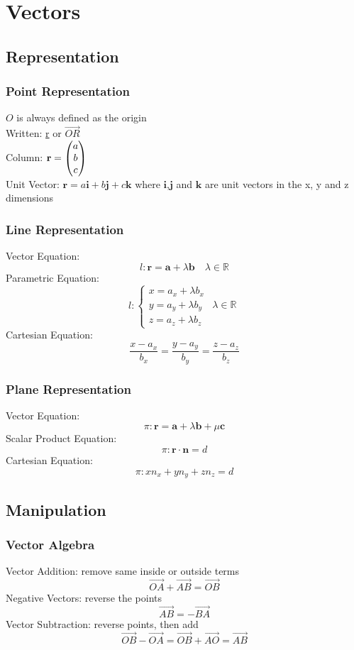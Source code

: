 \documentclass[../main]{subfiles}
\newcommand*\colvec[3][]{
    \begin{pmatrix}\ifx\relax#1\relax\else#1\\\fi#2\\#3\end{pmatrix}
}
\begin{document}
\section{Vectors}

\subsection{Representation}

	\subsubsection{Point Representation}
	\(O\) is always defined as the origin \\
	Written: \underline{r} or \( \overrightarrow{OR} \) \\
	Column: \( \mathbf{r} = \colvec[a]{b}{c} \) \\
	Unit Vector: \( \mathbf{r} = a\mathbf{i} + b\mathbf{j} + c\mathbf{k} \) where \(\mathbf{i}\),\(\mathbf{j}\) and \(\mathbf{k}\) are unit vectors in the x, y and z dimensions
	\subsubsection{Line Representation}
	Vector Equation:
	\[ l: \mathbf{r} = \mathbf{a} + \lambda \mathbf{b} \quad \lambda \in \mathbb{R} \]
	Parametric Equation:
	\begin{equation*}
		l:\begin{cases}
			x = a_x + \lambda b_x \\
			y = a_y + \lambda b_y \quad \lambda \in \mathbb{R} \\
			z = a_z + \lambda b_z 
		\end{cases}
	\end{equation*}
	Cartesian Equation:
	\[ \frac{x-a_x}{b_x} = \frac{y-a_y}{b_y} = \frac{z-a_z}{b_z} \]
	\subsubsection{Plane Representation}
	Vector Equation:
	\[ \pi : \mathbf{r} = \mathbf{a} + \lambda \mathbf{b} + \mu \mathbf{c} \]
	Scalar Product Equation:
	\[ \pi : \mathbf{r} \cdot \mathbf{n} = d \]
	Cartesian Equation:
	\[ \pi: xn_x + yn_y + zn_z = d \]

\subsection{Manipulation}

	\subsubsection{Vector Algebra}
	Vector Addition: remove same inside or outside terms
	\[ \overrightarrow{OA} + \overrightarrow{AB} = \overrightarrow{OB} \]
	Negative Vectors: reverse the points
	\[ \overrightarrow{AB} = -\overrightarrow{BA} \]
	Vector Subtraction: reverse points, then add
	\[ \overrightarrow{OB} - \overrightarrow{OA} = \overrightarrow{OB} + \overrightarrow{AO} = \overrightarrow{AB} \]
\end{document}
